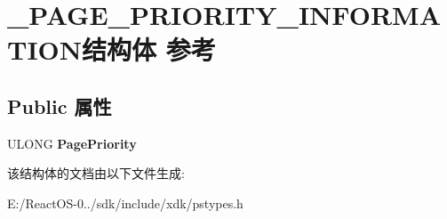 \hypertarget{struct___p_a_g_e___p_r_i_o_r_i_t_y___i_n_f_o_r_m_a_t_i_o_n}{}\section{\+\_\+\+P\+A\+G\+E\+\_\+\+P\+R\+I\+O\+R\+I\+T\+Y\+\_\+\+I\+N\+F\+O\+R\+M\+A\+T\+I\+O\+N结构体 参考}
\label{struct___p_a_g_e___p_r_i_o_r_i_t_y___i_n_f_o_r_m_a_t_i_o_n}
\subsection*{Public 属性}
\begin{DoxyCompactItemize}
\item 
\mbox{\label{struct___p_a_g_e___p_r_i_o_r_i_t_y___i_n_f_o_r_m_a_t_i_o_n_af9980f27323f12674538750307ac8d50}} 
U\+L\+O\+NG {\bfseries Page\+Priority}
\end{DoxyCompactItemize}


该结构体的文档由以下文件生成\+:\begin{DoxyCompactItemize}
\item 
E\+:/\+React\+O\+S-\/0../sdk/include/xdk/pstypes.\+h\end{DoxyCompactItemize}
